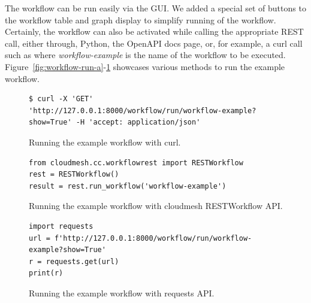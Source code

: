 The workflow can be run easily via the GUI. We added a special set of
buttons to the workflow table and graph display to simplify running of
the workflow. 
Certainly, the workflow can also be activated while
calling the appropriate REST call, either through, Python, the OpenAPI
docs page, or, for example, a curl call such as
where {\em workflow-example} is the name of the workflow to be
executed. Figure~\ref{fig:workflow-run-a}-\ref{fig:workflow-run-c} showcases various methods to
run the example workflow.


\begin{figure}[htb]

\begin{verbatim}
$ curl -X 'GET' 'http://127.0.0.1:8000/workflow/run/workflow-example?show=True' -H 'accept: application/json'
\end{verbatim}%
\flushleft
\caption{\parindent0pt Running the example workflow with curl.}
\label{fig:workflow-run-a}
\bigskip

\begin{verbatim} 
from cloudmesh.cc.workflowrest import RESTWorkflow
rest = RESTWorkflow()
result = rest.run_workflow('workflow-example')
\end{verbatim}

\caption{Running the example workflow with cloudmesh RESTWorkflow API.}
\label{fig:workflow-run-b}
\bigskip

\begin{verbatim}
import requests
url = f'http://127.0.0.1:8000/workflow/run/workflow-example?show=True'
r = requests.get(url)
print(r)
\end{verbatim}

\caption{Running the example workflow with requests API.}
\label{fig:workflow-run-c}

\end{figure}





